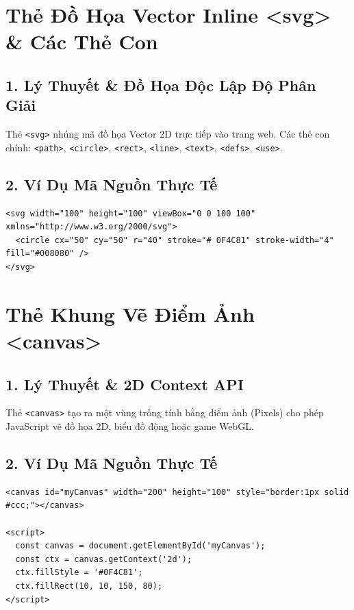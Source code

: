 \documentclass[11pt,oneside]{book}
\newcommand{\codeinline}[1]{\textcolor{accentOrange}{\texttt{#1}}}
\begin{document}
\section{Thẻ Đồ Họa Vector Inline <svg> \& Các Thẻ Con}
\subsection{1. Lý Thuyết \& Đồ Họa Độc Lập Độ Phân Giải}
Thẻ \codeinline{<svg>} nhúng mã đồ họa Vector 2D trực tiếp vào trang web. Các thẻ con chính: \codeinline{<path>}, \codeinline{<circle>}, \codeinline{<rect>}, \codeinline{<line>}, \codeinline{<text>}, \codeinline{<defs>}, \codeinline{<use>}.

\subsection{2. Ví Dụ Mã Nguồn Thực Tế}
\begin{lstlisting}[language=HTML5, caption={Ví dụ vẽ icon hình tròn và hình sao bằng SVG}]
<svg width="100" height="100" viewBox="0 0 100 100" xmlns="http://www.w3.org/2000/svg">
  <circle cx="50" cy="50" r="40" stroke="# 0F4C81" stroke-width="4" fill="#008080" />
</svg>
\end{lstlisting}

\section{Thẻ Khung Vẽ Điểm Ảnh <canvas>}
\subsection{1. Lý Thuyết \& 2D Context API}
Thẻ \codeinline{<canvas>} tạo ra một vùng trống tính bằng điểm ảnh (Pixels) cho phép JavaScript vẽ đồ họa 2D, biểu đồ động hoặc game WebGL.

\subsection{2. Ví Dụ Mã Nguồn Thực Tế}
\begin{lstlisting}[language=HTML5, caption={Ví dụ vẽ hình chữ nhật đỏ bằng Canvas API}]
<canvas id="myCanvas" width="200" height="100" style="border:1px solid #ccc;"></canvas>

<script>
  const canvas = document.getElementById('myCanvas');
  const ctx = canvas.getContext('2d');
  ctx.fillStyle = '#0F4C81';
  ctx.fillRect(10, 10, 150, 80);
</script>
\end{lstlisting}
\end{document}
